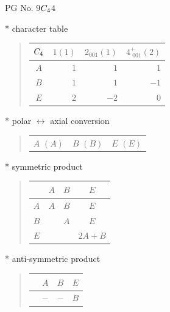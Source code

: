 \documentclass[fleqn,8pt,landscape]{jsarticle}
\begin{document}
\setcounter{MaxMatrixCols}{32}

\renewcommand{\tablename}{Table~}
\renewcommand{\figurename}{Figure~}
\begin{center}
\LARGE
PG No. 9\quad$C_{\rm 4}$\quad$4$\quad[ tetragonal ]
\end{center}

* character table
\begin{quote}
\begin{tabular}{crrr} \hline \hline
$ C_{\rm 4} $ & $ 1(1) $ & $ 2{}_{001}(1) $ & $ 4^{+}_{\,\,001}(2) $ \\ \hline
$ A $ & $ 1 $ & $ 1 $ & $ 1 $ \\
$ B $ & $ 1 $ & $ 1 $ & $ -1 $ \\
$ E $ & $ 2 $ & $ -2 $ & $ 0 $ \\
 \hline \hline
\end{tabular}
\end{quote}

* polar $\leftrightarrow$ axial conversion
\begin{quote}
\begin{tabular}{ccc}
$ A\,\,(A) $ & $ B\,\,(B) $ & $ E\,\,(E) $
\end{tabular}
\end{quote}

* symmetric product
\begin{quote}
\begin{tabular}{c|ccc} \hline \hline
 & $ A $ & $ B $ & $ E $ \\ \hline
$ A $ & $ A $ & $ B $ & $ E $ \\
$ B $ & $  $ & $ A $ & $ E $ \\
$ E $ & $  $ & $  $ & $ 2 A + B $ \\
 \hline \hline
\end{tabular}
\end{quote}

* anti-symmetric product
\begin{quote}
\begin{tabular}{cccc} \hline \hline
 & $ A $ & $ B $ & $ E $ \\ \hline
$  $ & $ - $ & $ - $ & $ B $ \\
 \hline \hline
\end{tabular}
\end{quote}
\end{document}
